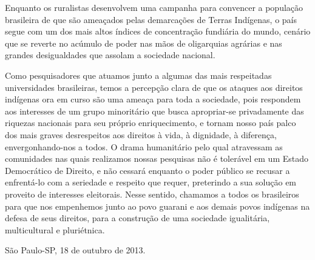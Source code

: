 \documentclass{article}
\begin{document}
Enquanto os ruralistas desenvolvem uma campanha para convencer a
popula\c{c}\~ao brasileira de que s\~ao amea\c{c}ados pelas
demarca\c{c}\~oes de Terras Ind\'igenas, o pa\'is segue com um dos mais
altos \'indices de concentra\c{c}\~ao fundi\'aria do mundo, cen\'ario
que se reverte no ac\'umulo de poder nas m\~aos de oligarquias
agr\'arias e nas grandes desigualdades que assolam a sociedade
nacional. 

Como pesquisadores que atuamos junto a algumas das mais respeitadas
universidades brasileiras, temos a percep\c{c}\~ao clara de que os
ataques aos direitos ind\'igenas ora em curso s\~ao uma amea\c{c}a para
toda a sociedade, pois respondem aos interesses de um grupo
minorit\'ario que busca apropriar-se privadamente das riquezas
nacionais para seu pr\'oprio enriquecimento, e tornam nosso pa\'is
palco dos mais graves desrespeitos aos direitos \`a vida, \`a
dignidade, \`a diferen\c{c}a, envergonhando-nos a todos. O drama
humanit\'ario pelo qual atravessam as comunidades nas quais realizamos
nossas pesquisas n\~ao \'e toler\'avel em um Estado Democr\'atico de
Direito, e n\~ao cessar\'a enquanto o poder p\'ublico se recusar a
enfrent\'a-lo com a seriedade e respeito que requer, preterindo a sua
solu\c{c}\~ao em proveito de interesses eleitorais. Nesse sentido,
chamamos a todos os brasileiros para que nos empenhemos junto ao povo
guarani e aos demais povos ind\'igenas na defesa de seus direitos, para
a constru\c{c}\~ao de uma sociedade igualit\'aria, multicultural e
pluri\'etnica.

S\~ao Paulo-SP, 18 de outubro de 2013.
\end{document}
